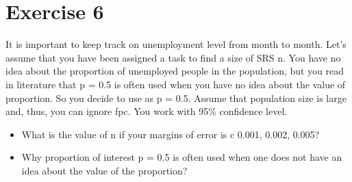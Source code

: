 \documentclass[12pt]{article}
\begin{document}
\section*{Exercise 6}
It is important to keep track on unemployment level from month to month. Let’s assume that you have been assigned a task to find a size of SRS n. You have no idea about the proportion of unemployed people in the population, but you read in literature that p = 0.5 is often used when you have no idea about the value of proportion. So you decide to use as p = 0.5. Assume that population size is large and, thus, you can ignore fpc. You work with 95\% confidence level.
\begin{itemize}
\item What is the value of n if your margins of error is c 0.001, 0.002, 0.005? \\


\item	Why proportion of interest p = 0.5 is often used when one does not have an idea about the value of the proportion?\\
\end{itemize}
\end{document}
